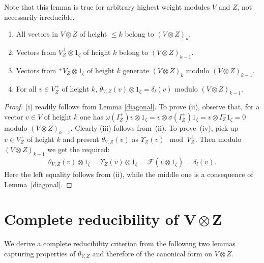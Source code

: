Note that this lemma is true for arbitrary highest weight modules $V$ and $Z$, not necessarily irreducible.
\begin{Corollary}\label{two-filtrations}\quad
\begin{enumerate}\itemsep=0pt
 \item[$i)$] All vectors in $V\otimes Z$ of height $\leqslant k$ belong to $(V\otimes Z)_{k}$.
\item[$ii)$] Vectors from $V^\perp_Z\otimes 1_\zeta$ of height $k$ belong to $(V\otimes Z)_{k-1}$.
 \item[$iii)$] Vectors from ${}^+\!V_Z\otimes 1_\zeta$ of height $k$ generate $(V\otimes Z)_k$ modulo $(V\otimes Z)_{k-1}$.
\item[$iv)$] For all $v\in V^+_Z$ of height $k$, $\theta_{V,Z}(v)\otimes 1_\zeta=\delta_l(v)$ modulo $(V\otimes Z)_{k-1}$.
\end{enumerate}
\end{Corollary}
\begin{proof}(i) readily follows from Lemma \ref{diagonal}. To prove (ii), observe that, for a vector $v\in V$ of height $k$ one has $\omega(I^+_Z)v\otimes 1_\zeta=v\otimes \sigma(I^+_Z) 1_\zeta=v\otimes I^-_Z 1_\zeta =0$
modulo $(V\otimes Z)_{k-1}$. Clearly (iii) follows from~(ii). To prove~(iv), pick up $v\in V^+_Z$ of height $k$ and present $\theta_{V,Z}(v)$ as $\Upsilon_Z(v) \mod V^\perp_Z$. Then modulo $(V\otimes Z)_{k-1}$ we get the required:
\begin{gather*}
\theta_{V,Z}(v)\otimes 1_\zeta=\Upsilon_Z(v) \otimes 1_\zeta = \mathcal{F}(v\otimes 1_\zeta)=\delta_l(v).
\end{gather*}
Here the left equality follows from (ii), while the middle one is a consequence of Lemma~\ref{diagonal}.
\end{proof}

\section[Complete reducibility of $V\otimes Z$]{Complete reducibility of $\boldsymbol{V\otimes Z}$}
We derive a complete reducibility criterion from the following two lemmas capturing properties of $\theta_{V,Z}$ and therefore of the canonical form on $V\otimes Z$.

